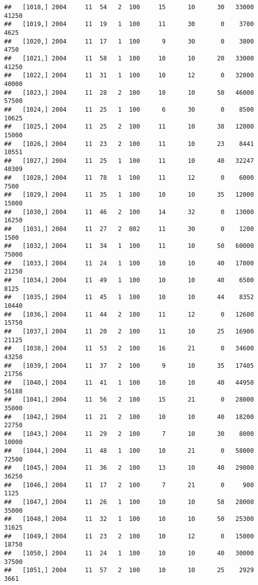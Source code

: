 \documentclass{article}\usepackage[]{graphicx}\usepackage[]{color}
\makeatletter
\newenvironment{kframe}{%
 \def\at@end@of@kframe{}%
 \ifinner\ifhmode%
  \def\at@end@of@kframe{\end{minipage}}%
  \begin{minipage}{\columnwidth}%
 \fi\fi%
 \def\FrameCommand##1{\hskip\@totalleftmargin \hskip-\fboxsep
 \colorbox{shadecolor}{##1}\hskip-\fboxsep
     \hskip-\linewidth \hskip-\@totalleftmargin \hskip\columnwidth}%
 \MakeFramed {\advance\hsize-\width
   \@totalleftmargin\z@ \linewidth\hsize
   \@setminipage}}%
 {\par\unskip\endMakeFramed%
 \at@end@of@kframe}
\newenvironment{knitrout}{}{} %
\makeatother
\begin{document}
\begin{knitrout}
\begin{kframe}
\begin{verbatim}
##   [1018,] 2004     11  54   2  100     15      10      30   33000   41250
##   [1019,] 2004     11  19   1  100     11      30       0    3700    4625
##   [1020,] 2004     11  17   1  100      9      30       0    3800    4750
##   [1021,] 2004     11  58   1  100     10      10      20   33000   41250
##   [1022,] 2004     11  31   1  100     10      12       0   32000   40000
##   [1023,] 2004     11  28   2  100     10      10      50   46000   57500
##   [1024,] 2004     11  25   1  100      6      30       0    8500   10625
##   [1025,] 2004     11  25   2  100     11      10      38   12000   15000
##   [1026,] 2004     11  23   2  100     11      10      23    8441   10551
##   [1027,] 2004     11  25   1  100     11      10      40   32247   40309
##   [1028,] 2004     11  78   1  100     11      12       0    6000    7500
##   [1029,] 2004     11  35   1  100     10      10      35   12000   15000
##   [1030,] 2004     11  46   2  100     14      32       0   13000   16250
##   [1031,] 2004     11  27   2  802     11      30       0    1200    1500
##   [1032,] 2004     11  34   1  100     11      10      50   60000   75000
##   [1033,] 2004     11  24   1  100     10      10      40   17000   21250
##   [1034,] 2004     11  49   1  100     10      10      40    6500    8125
##   [1035,] 2004     11  45   1  100     10      10      44    8352   10440
##   [1036,] 2004     11  44   2  100     11      12       0   12600   15750
##   [1037,] 2004     11  20   2  100     11      10      25   16900   21125
##   [1038,] 2004     11  53   2  100     16      21       0   34600   43250
##   [1039,] 2004     11  37   2  100      9      10      35   17405   21756
##   [1040,] 2004     11  41   1  100     10      10      40   44950   56188
##   [1041,] 2004     11  56   2  100     15      21       0   28000   35000
##   [1042,] 2004     11  21   2  100     10      10      40   18200   22750
##   [1043,] 2004     11  29   2  100      7      10      30    8000   10000
##   [1044,] 2004     11  48   1  100     10      21       0   58000   72500
##   [1045,] 2004     11  36   2  100     13      10      40   29000   36250
##   [1046,] 2004     11  17   2  100      7      21       0     900    1125
##   [1047,] 2004     11  26   1  100     10      10      58   28000   35000
##   [1048,] 2004     11  32   1  100     10      10      50   25300   31625
##   [1049,] 2004     11  23   2  100     10      12       0   15000   18750
##   [1050,] 2004     11  24   1  100     10      10      40   30000   37500
##   [1051,] 2004     11  57   2  100     10      10      25    2929    3661

\end{verbatim}
\end{kframe}
\end{knitrout}
\end{document}
